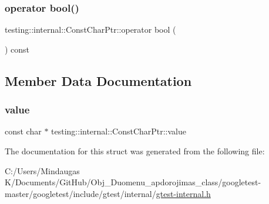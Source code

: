 \subsubsection{\texorpdfstring{operator bool()}{operator bool()}\hspace{0.1cm}{\footnotesize\ttfamily [3/3]}}
{\footnotesize\ttfamily testing\+::internal\+::\+Const\+Char\+Ptr\+::operator bool (\begin{DoxyParamCaption}{ }\end{DoxyParamCaption}) const\hspace{0.3cm}{\ttfamily [inline]}}



\subsection{Member Data Documentation}
\mbox{\label{structtesting_1_1internal_1_1_const_char_ptr_a39e195c4214c28f7b1a7dd711742c56e}} 
\subsubsection{\texorpdfstring{value}{value}}
{\footnotesize\ttfamily const char $\ast$ testing\+::internal\+::\+Const\+Char\+Ptr\+::value}



The documentation for this struct was generated from the following file\+:\begin{DoxyCompactItemize}
\item 
C\+:/\+Users/\+Mindaugas K/\+Documents/\+Git\+Hub/\+Obj\+\_\+\+Duomenu\+\_\+apdorojimas\+\_\+class/googletest-\/master/googletest/include/gtest/internal/\mbox{\hyperlink{googletest-master_2googletest_2include_2gtest_2internal_2gtest-internal_8h}{gtest-\/internal.\+h}}\end{DoxyCompactItemize}
